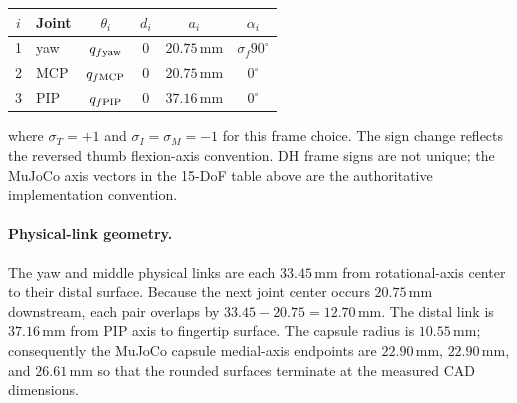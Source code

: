 \documentclass[11pt]{article}
\newcommand{\mm}{\,\mathrm{mm}}
\newcommand{\degc}{^{\circ}}
\begin{document}
\begin{center}
\begin{tabular}{clcccc}
\toprule
$i$ & Joint & $\theta_i$ & $d_i$ & $a_i$ & $\alpha_i$ \\
\midrule
1 & yaw & $q_{f\rm yaw}$ & $0$ & $20.75\mm$ & $\sigma_f 90\degc$ \\
2 & MCP & $q_{f\rm MCP}$ & $0$ & $20.75\mm$ & $0\degc$ \\
3 & PIP & $q_{f\rm PIP}$ & $0$ & $37.16\mm$ & $0\degc$ \\
\bottomrule
\end{tabular}
\end{center}
where $\sigma_T=+1$ and $\sigma_I=\sigma_M=-1$ for this frame choice. The sign change reflects the reversed thumb flexion-axis convention. DH frame signs are not unique; the MuJoCo axis vectors in the 15-DoF table above are the authoritative implementation convention.

\paragraph{Physical-link geometry.}
The yaw and middle physical links are each $33.45\mm$ from rotational-axis center to their distal surface. Because the next joint center occurs $20.75\mm$ downstream, each pair overlaps by $33.45-20.75=12.70\mm$. The distal link is $37.16\mm$ from PIP axis to fingertip surface. The capsule radius is $10.55\mm$; consequently the MuJoCo capsule medial-axis endpoints are $22.90\mm$, $22.90\mm$, and $26.61\mm$ so that the rounded surfaces terminate at the measured CAD dimensions.
\end{document}
